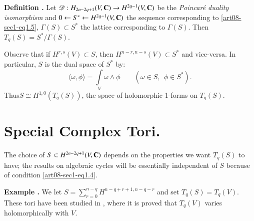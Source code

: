 \medskip
\noindent
{\bf Definition .\label{art08-sec1-defi3}}
Let $\mathscr{D}:H_{2n-2q+1}(V,\mathbf{C})\to H^{2q-1}(V,\mathbf{C})$ be the {\em Poincar\'e duality isomorphism} and $0\leftarrow S^{*}\leftarrow H^{2q-1}(V,\mathbf{C})$ the sequence corresponding to \eqref{art08-sec1-eq1.5}, $\Gamma(S)\subset S^{*}$ the lattice corresponding to $\Gamma(S)$. Then $T_{q}(S)=S^{*}/\Gamma(S)$.
\smallskip

Observe that if $H^{r,s}(V)\subset S$, then $H^{n-r,n-s}(V)\subset S^{*}$ and vice-versa. In particular, $S$ is the dual space of $S^{*}$ by:
\begin{equation*}
\langle \omega,\phi\rangle =\int\limits_{V}\omega\wedge \phi\qquad (\omega\in S, \ \ \phi\in S^{*}).\tag{1.6}\label{art08-sec1-eq1.6}
\end{equation*}
Thus\pageoriginale $S\cong H^{1,0}(T_{q}(S))$, the space of holomorphic 1-forms on $T_{q}(S)$.


\section{Special Complex Tori.}\label{art08-sec2}



The choice of $S\subset H^{2n-2q+1}(V,\mathbf{C})$ depends on the properties we want $T_{q}(S)$ to have; the results on algebraic cycles will be essentially independent of $S$ because of condition \eqref{art08-sec1-eq1.4}.

\medskip
\noindent
{\bf Example .\label{art08-sec2-exam1}}
We let $S=\sum\limits^{n-q}_{r=0}H^{n-q+r+1,n-q-r}$ and set $T_{q}(S)=T_{q}(V)$. These tori have been studied in \cite{art08-key9}, where it is proved that $T_{q}(V)$ varies holomorphically with $V$.
\smallskip


